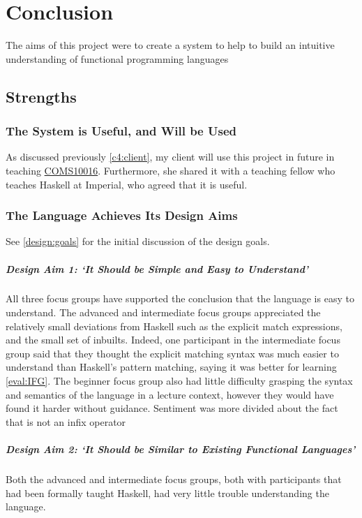\chapter{Conclusion}
\label{chap:conclusion}
The aims of this project were to create a system to help to build an intuitive understanding of functional programming languages


\section{Strengths}
\subsection{The System is Useful, and Will be Used}
As discussed previously \ref{c4:client}, my client will use this project in future in teaching \hyperref[COMS10016]{COMS10016}. Furthermore, she shared it with a teaching fellow who teaches Haskell at Imperial, who agreed that it is useful. 

\subsection{The Language Achieves Its Design Aims}
See \ref{design:goals} for the initial discussion of the design goals. 

\paragraph{Design Aim 1: `It Should be Simple and Easy to Understand'}
All three focus groups have supported the conclusion that the language is easy to understand. The advanced and intermediate focus groups appreciated the relatively small deviations from Haskell such as the explicit match expressions, and the small set of inbuilts. Indeed, one participant in the intermediate focus group said that they thought the explicit matching syntax was much easier to understand than Haskell's pattern matching, saying it was better for learning \ref{eval:IFG}. The beginner focus group also had little difficulty grasping the syntax and semantics of the language in a lecture context, however they would have found it harder without guidance. Sentiment was more divided about the fact that  is not an infix operator


\paragraph{Design Aim 2: `It Should be Similar to Existing Functional Languages'}
Both the advanced and intermediate focus groups, both with participants that had been formally taught Haskell, had very little trouble understanding the language. 

